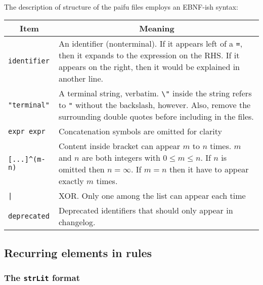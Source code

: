 \documentclass[%
	a4paper%
	,10pt%
	,twoside%
	,notitlepage%
]{article}%
\begin{document}
		\paragraph*{}The description of structure of the paifu files employs an EBNF-ish syntax: %
		\begin{center}\begin{tabular}{|l|p{}|}\hline%
			\multicolumn{1}{|c|}{Item}&\multicolumn{1}{c|}{Meaning}\\\hline%
			\lstinline[classoffset=1,morekeywords={identifier},classoffset=0]/identifier/&An identifier (nonterminal). \newline%
				If it appears left of a \lstinline/=/, then it expands to the expression on the RHS. \newline%
				If it appears on the right, then it would be explained in another line. \\\hline%
			\lstinline/"terminal"/&A terminal string, verbatim. \newline%
				\verb|\"| inside the string refers to \verb|"| without the backslash, however. \newline%
				Also, remove the surrounding double quotes before including in the files. \\\hline%
			\lstinline/expr expr/&Concatenation symbols are omitted for clarity\\\hline%
			\lstinline/[...]^(m-n)/&Content inside bracket can appear $m$ to $n$ times. \newline%
				$m$ and $n$ are both integers with $0 \le m \le n$. \newline%
				If $n$ is omitted then $n=\infty$. \newline%
				If $m=n$ then it have to appear exactly $m$ times. \\\hline%
			\lstinline/|/&XOR. Only one among the list can appear each time\\\hline%
			\lstinline[classoffset=2,morekeywords={deprecated},classoffset=0]/deprecated/&Deprecated identifiers that should only appear in changelog. \\\hline%
		\end{tabular}\end{center}%
	\subsection{Recurring elements in rules}\label{subsec:recur}%
		\subsubsection{The \texttt{strLit} format}\label{subsubsec:strlit}%
\end{document}
